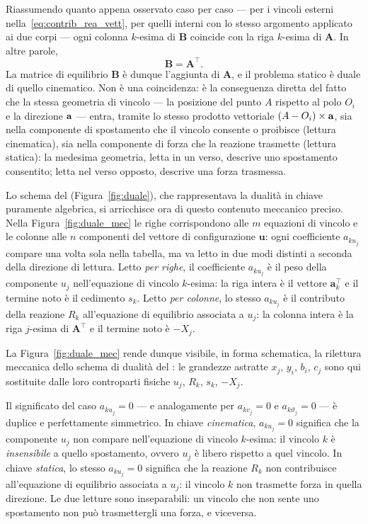 Riassumendo quanto appena osservato caso per caso --- per i
vincoli esterni nella~\eqref{eq:contrib_rea_vett}, per quelli
interni con lo stesso argomento applicato ai due corpi --- ogni
colonna $k$-esima di $\bm{B}$ coincide con la riga $k$-esima di
$\bm{A}$. In altre parole,
\begin{equation}
	\bm{B} = \bm{A}^{\top}.
\end{equation}
La matrice di equilibrio $\bm{B}$ è dunque l'aggiunta di
$\bm{A}$, e il problema statico è duale di quello cinematico.
Non è una coincidenza: è la conseguenza diretta del fatto che
la stessa geometria di vincolo --- la posizione del punto $A$
rispetto al polo $O_i$ e la direzione $\mathbf{a}$ --- entra, tramite
lo stesso prodotto vettoriale $(A-O_i)\times\mathbf{a}$, sia nella
componente di spostamento che il vincolo consente o proibisce
(lettura cinematica), sia nella componente di forza che la
reazione trasmette (lettura statica): la medesima geometria,
letta in un verso, descrive uno spostamento consentito; letta
nel verso opposto, descrive una forza trasmessa.

Lo schema del  (Figura~\ref{fig:duale}),
che rappresentava la dualità in chiave puramente
algebrica, si arricchisce ora di questo contenuto meccanico
preciso. Nella Figura~\ref{fig:duale_mec} le righe
corrispondono alle $m$ equazioni di vincolo e le colonne
alle $n$ componenti del vettore di configurazione
$\bm{u}$: ogni coefficiente $a_{ku_j}$ compare una volta
sola nella tabella, ma va letto in due modi distinti a
seconda della direzione di lettura. Letto \emph{per
	righe}, il coefficiente $a_{ku_j}$ è il peso della
componente $u_j$ nell'equazione di vincolo $k$-esima:
la riga intera è il vettore $\bm{a}_k^\top$ e il termine
noto è il cedimento $s_k$. Letto \emph{per colonne},
lo stesso $a_{ku_j}$ è il contributo della reazione $R_k$
all'equazione di equilibrio associata a $u_j$: la colonna
intera è la riga $j$-esima di $\bm{A}^\top$ e il termine
noto è $-X_j$.



La Figura~\ref{fig:duale_mec} rende dunque visibile, in forma
schematica, la rilettura meccanica dello schema di dualità del
: le grandezze astratte
$x_j$, $y_i$, $b_i$, $c_j$ sono qui sostituite dalle loro
controparti fisiche $u_j$, $R_k$, $s_k$, $-X_j$.
\begin{oss}
	Il significato del caso $a_{ku_j} = 0$ --- e
	analogamente per $a_{kv_j} = 0$ e
	$a_{k\vartheta_j} = 0$ --- è duplice e perfettamente
	simmetrico. In chiave \emph{cinematica}, $a_{ku_j} = 0$
	significa che la componente $u_j$ non compare
	nell'equazione di vincolo $k$-esima: il vincolo $k$ è
	\emph{insensibile} a quello spostamento, ovvero $u_j$
	è libero rispetto a quel vincolo. In chiave
	\emph{statica}, lo stesso $a_{ku_j} = 0$ significa che
	la reazione $R_k$ non contribuisce all'equazione di
	equilibrio associata a $u_j$: il vincolo $k$ non
	trasmette forza in quella direzione. Le due letture
	sono inseparabili: un vincolo che non sente uno
	spostamento non può trasmettergli una forza, e
	viceversa.
\end{oss}


